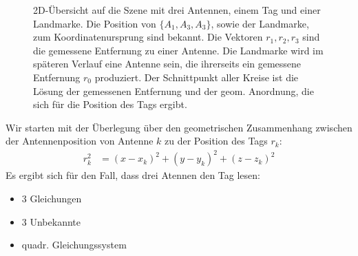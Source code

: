 \begin{figure}[h]
	\begin{center}
		\caption[TrilaterationAbbildung]{2D-Übersicht auf die Szene mit drei Antennen, einem Tag und einer Landmarke. Die Position von $\{A_1,A_3,A_3\}$, sowie der Landmarke, zum Koordinatenursprung sind bekannt. Die Vektoren $r_1,r_2,r_3$ sind die gemessene Entfernung zu einer Antenne. Die Landmarke wird im späteren Verlauf eine Antenne sein, die ihrerseits ein gemessene Entfernung $r_0$ produziert. Der Schnittpunkt aller Kreise ist die Lösung der gemessenen Entfernung und der geom. Anordnung, die sich für die Position des Tags ergibt.} 
		
		
	\end{center}
\end{figure}
%
Wir starten mit der Überlegung über den geometrischen Zusammenhang zwischen der Antennenposition von Antenne $k$ zu der Position des Tags $r_k$:
\begin{align}
r_{k}^2 &= (x-x_k)^2+(y-y_k)^2+(z-z_k)^2
%	
\end{align}
%
Es ergibt sich für den Fall, dass drei Atennen den Tag lesen:
\begin{itemize}
\item 3 Gleichungen
\item 3 Unbekannte
\item quadr. Gleichungssystem
\end{itemize}

